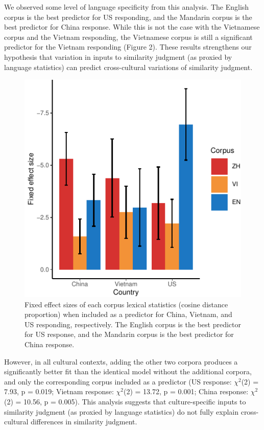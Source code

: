\documentclass[10pt, letterpaper]{article}
\newenvironment{CodeChunk}{}{}
\begin{document}
We observed some level of language specificity from this analysis. The
English corpus is the best predictor for US responding, and the Mandarin
corpus is the best predictor for China response. While this is not the
case with the Vietnamese corpus and the Vietnam responding, the
Vietnamese corpus is still a significant predictor for the Vietnam
responding (Figure 2). These results strengthens our hypothesis that
variation in inputs to similarity judgment (as proxied by language
statistics) can predict cross-cultural variations of similarity
judgment.

\begin{CodeChunk}
\begin{figure}[tb]

{\centering \includegraphics{figs/coeffs_cos-1} 

}

\caption[Fixed effect sizes of each corpus lexical statistics (cosine distance proportion) when included as a predictor for China, Vietnam, and US responding, respectively]{Fixed effect sizes of each corpus lexical statistics (cosine distance proportion) when included as a predictor for China, Vietnam, and US responding, respectively. The English corpus is the best predictor for US response, and the Mandarin corpus is the best predictor for China response.}\label{fig:coeffs_cos}
\end{figure}
\end{CodeChunk}

However, in all cultural contexts, adding the other two corpora produces
a significantly better fit than the identical model without the
additional corpora, and only the corresponding corpus included as a
predictor (US response: \(\chi^2\)(2) = 7.93, p = 0.019; Vietnam
response: \(\chi^2\)(2) = 13.72, p = 0.001; China response:
\(\chi^2\)(2) = 10.56, p = 0.005). This analysis suggests that
culture-specific inputs to similarity judgment (as proxied by language
statistics) do not fully explain cross-cultural differences in
similarity judgment.
\end{document}
